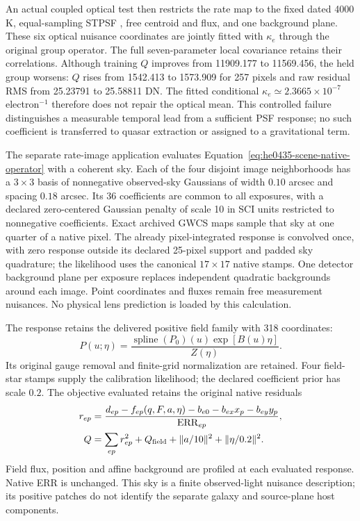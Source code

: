 An actual coupled optical test then restricts the rate map to the
fixed dated 4000 K, equal-sampling STPSF \citep{STPSFMeasuredOPD}, free centroid and flux, and
one background plane. These six optical nuisance coordinates are
jointly fitted with $\kappa_e$ through the original group operator.
The full seven-parameter local covariance retains their correlations.
Although training $Q$ improves from 11909.177 to 11569.456, the held
group worsens: $Q$ rises from 1542.413 to 1573.909 for 257 pixels and
raw residual RMS from 25.23791 to 25.58811 DN. The fitted conditional
$\kappa_e\simeq2.3665\times10^{-7}$ electron$^{-1}$ therefore does not repair
the optical mean. This controlled failure distinguishes a measurable
temporal lead from a sufficient PSF response; no such coefficient is
transferred to quasar extraction or assigned to a gravitational term.

The separate rate-image application evaluates
Equation~\eqref{eq:he0435-scene-native-operator} with a coherent sky.
Each of the four disjoint image neighborhoods has a $3\times3$ basis
of nonnegative observed-sky Gaussians of width $0.10$ arcsec and spacing
$0.18$ arcsec. Its 36 coefficients are common to all exposures, with
a declared zero-centered Gaussian penalty of scale 10 in SCI units
restricted to nonnegative coefficients. Exact archived GWCS maps
sample that sky at one quarter of a native pixel. The already
pixel-integrated response is convolved once, with zero response
outside its declared 25-pixel support and padded sky quadrature;
the likelihood uses the canonical $17\times17$ native stamps.
One detector background plane per exposure replaces independent
quadratic backgrounds around each image. Point coordinates and fluxes
remain free measurement nuisances. No physical lens prediction is
loaded by this calculation.

The response retains the delivered positive field family with 318
coordinates:
\begin{equation}
 P(u;\eta)=\frac{\operatorname{spline}(P_0)(u)
                    \exp[B(u)\eta]}{Z(\eta)}.
\end{equation}
Its original gauge removal and finite-grid normalization are retained.
Four field-star stamps supply the calibration
likelihood; the declared coefficient prior has scale $0.2$.
The objective evaluated retains the original native residuals
\begin{align}
 r_{ep}&=\frac{d_{ep}-f_{ep}(q,F,a,\eta)
                    -b_{e0}-b_{ex}x_p-b_{ey}y_p}{\mathrm{ERR}_{ep}},\nonumber\\
 Q&=\sum_{ep}r_{ep}^2+Q_{\rm field}
             +\|a/10\|^2+\|\eta/0.2\|^2 .
 \label{eq:he0435-scene-original-residual}
\end{align}
Field flux, position and affine background are profiled at each
evaluated response. Native ERR is unchanged. This sky is a finite
observed-light nuisance description; its positive patches do not
identify the separate galaxy and source-plane host components.

